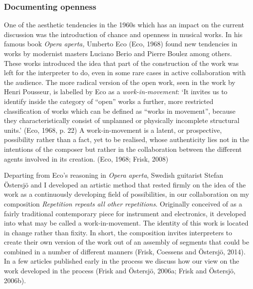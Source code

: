 \hypertarget{documenting-openness}{%
\subsubsection{Documenting openness}\label{documenting-openness}}

One of the aesthetic tendencies in the 1960s which has an impact on the
current discussion was the introduction of chance and openness in
musical works. In his famous book \emph{Opera aperta,} Umberto Eco (Eco,
1968) found new tendencies in works by modernist masters Luciano Berio
and Pierre Boulez among others. These works introduced the idea that
part of the construction of the work was left for the interpreter to do,
even in some rare cases in active collaboration with the audience. The
more radical version of the open work, seen in the work by Henri
Pousseur, is labelled by Eco as a \emph{work-in-movement}: `It invites
us to identify inside the category of ``open'' works a further, more
restricted classification of works which can be defined as ``works in
movement'', because they characteristically consist of unplanned or
physically incomplete structural units.' (Eco, 1968, p. 22) A
work-in-movement is a latent, or prospective, possibility rather than a
fact, yet to be realised, whose authenticity lies not in the intentions
of the composer but rather in the collaboration between the different
agents involved in its creation. (Eco, 1968; Frisk, 2008)

Departing from Eco's reasoning in \emph{Opera aperta}, Swedish guitarist
Stefan Östersjö and I developed an artistic method that rested firmly on
the idea of the work as a continuously developing field of
possibilities, in our collaboration on my composition \emph{Repetition
repeats all other repetitions}. Originally conceived of as a fairly
traditional contemporary piece for instrument and electronics, it
developed into what may be called a work-in-movement. The identity of
this work is located in change rather than fixity. In short, the
composition invites interpreters to create their own version of the work
out of an assembly of segments that could be combined in a number of
different manners (Frisk, Coessens and Östersjö, 2014). In a few
articles published early in the process we discuss how our view on the
work developed in the process (Frisk and Östersjö, 2006a; Frisk and
Östersjö, 2006b).

